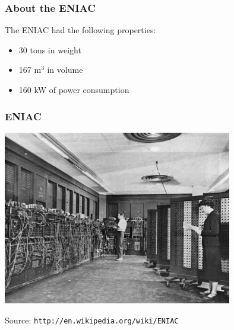 \begin{frame}
\frametitle{About the ENIAC}

The ENIAC had the following properties:
\begin{itemize}
	\item 30 tons in weight
	\item 167 m$^{3}$ in volume
	\item 160 kW of power consumption
\end{itemize}

\end{frame}

\begin{frame}
\frametitle{ENIAC}
\begin{center}
\includegraphics[width=0.75\textwidth]{images/eniac.jpg}

\tiny{Source: \texttt{http://en.wikipedia.org/wiki/ENIAC}}
\end{center}


\end{frame}

